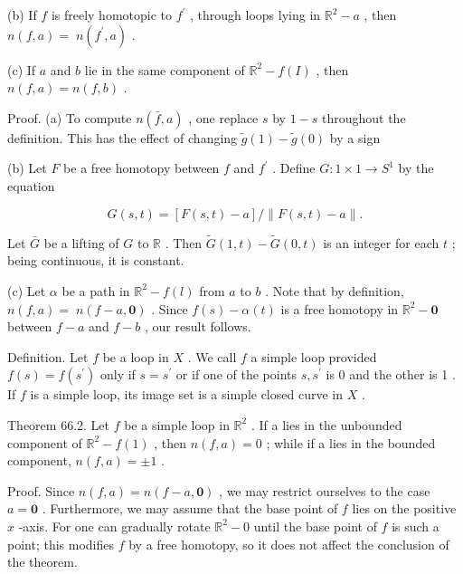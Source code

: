 \documentclass[10pt]{article}
\begin{document}
(b) If \(f\) is freely homotopic to \({f}^{\prime }\) , through loops lying in \({\mathbb{R}}^{2} - a\) , then \(n\left( {f,a}\right)  = \; n\left( {{f}^{\prime },a}\right)\) .

(c) If \(a\) and \(b\) lie in the same component of \({\mathbb{R}}^{2} - f\left( I\right)\) , then \(n\left( {f,a}\right)  = n\left( {f,b}\right)\) .

Proof. (a) To compute \(n\left( {\bar{f},a}\right)\) , one replace \(s\) by \(1 - s\) throughout the definition. This has the effect of changing \(\widetilde{g}\left( 1\right)  - \widetilde{g}\left( 0\right)\) by a sign

(b) Let \(F\) be a free homotopy between \(f\) and \({f}^{\prime }\) . Define \(G : 1 \times  1 \rightarrow  {S}^{1}\) by the equation

\[
G\left( {s,t}\right)  = \left\lbrack  {F\left( {s,t}\right)  - a}\right\rbrack  /\parallel F\left( {s,t}\right)  - a\parallel .
\]

Let \(\bar{G}\) be a lifting of \(G\) to \(\mathbb{R}\) . Then \(\widetilde{G}\left( {1,t}\right)  - \widetilde{G}\left( {0,t}\right)\) is an integer for each \(t\) ; being continuous, it is constant.

(c) Let \(\alpha\) be a path in \({\mathbb{R}}^{2} - f\left( l\right)\) from \(a\) to \(b\) . Note that by definition, \(n\left( {f,a}\right)  = \; n\left( {f - a,\mathbf{0}}\right)\) . Since \(f\left( s\right)  - \alpha \left( t\right)\) is a free homotopy in \({\mathbb{R}}^{2} - \mathbf{0}\) between \(f - a\) and \(f - b\) , our result follows.

Definition. Let \(f\) be a loop in \(X\) . We call \(f\) a simple loop provided \(f\left( s\right)  = f\left( {s}^{\prime }\right)\) only if \(s = {s}^{\prime }\) or if one of the points \(s,{s}^{\prime }\) is 0 and the other is 1 . If \(f\) is a simple loop, its image set is a simple closed curve in \(X\) .

Theorem 66.2. Let \(f\) be a simple loop in \({\mathbb{R}}^{2}\) . If a lies in the unbounded component of \({\mathbb{R}}^{2} - f\left( 1\right)\) , then \(n\left( {f,a}\right)  = 0\) ; while if a lies in the bounded component, \(n\left( {f,a}\right)  =  \pm  1\) .

Proof. Since \(n\left( {f,a}\right)  = n\left( {f - a,\mathbf{0}}\right)\) , we may restrict ourselves to the case \(a = \mathbf{0}\) . Furthermore, we may assume that the base point of \(f\) lies on the positive \(x\) -axis. For one can gradually rotate \({\mathbb{R}}^{2} - 0\) until the base point of \(f\) is such a point; this modifies \(f\) by a free homotopy, so it does not affect the conclusion of the theorem.
\end{document}
